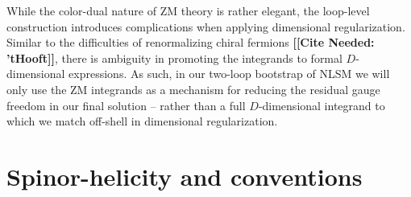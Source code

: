\documentclass[11pt,letter]{article}
\newcommand{\citepls}[1]{{\bf\color{red}[[Cite Needed: #1]]}}
\begin{document}
While the color-dual nature of ZM theory is rather elegant, the loop-level construction introduces complications when applying dimensional regularization. Similar to the difficulties of renormalizing chiral fermions \citepls{ 'tHooft}, there is ambiguity in promoting the integrands to formal $D$-dimensional expressions. As such, in our two-loop bootstrap of NLSM we will only use the ZM integrands as a mechanism for reducing the residual gauge freedom in our final solution -- rather than a full $D$-dimensional integrand to which we match off-shell in dimensional regularization.

\section{Spinor-helicity and conventions}\label{Conventions}
\end{document}
